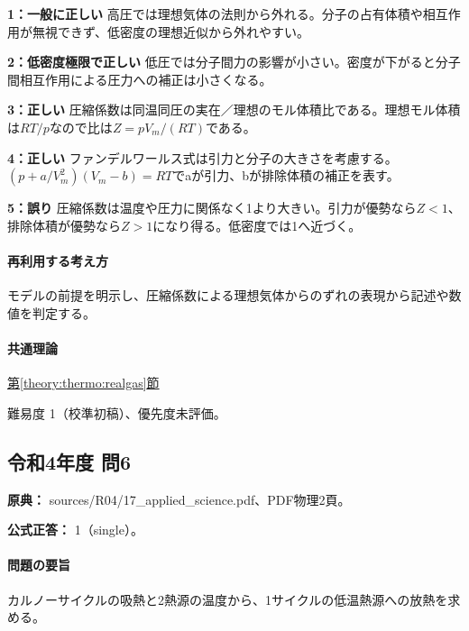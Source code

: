 \noindent\textbf{1：一般に正しい} 高圧では理想気体の法則から外れる。分子の占有体積や相互作用が無視できず、低密度の理想近似から外れやすい。\par

\noindent\textbf{2：低密度極限で正しい} 低圧では分子間力の影響が小さい。密度が下がると分子間相互作用による圧力への補正は小さくなる。\par

\noindent\textbf{3：正しい} 圧縮係数は同温同圧の実在／理想のモル体積比である。理想モル体積は\(RT/p\)なので比は\(Z=pV_m/(RT)\)である。\par

\noindent\textbf{4：正しい} ファンデルワールス式は引力と分子の大きさを考慮する。\((p+a/V_m^2)(V_m-b)=RT\)でaが引力、bが排除体積の補正を表す。\par

\noindent\textbf{5：誤り} 圧縮係数は温度や圧力に関係なく1より大きい。引力が優勢なら\(Z<1\)、排除体積が優勢なら\(Z>1\)になり得る。低密度では1へ近づく。\par

\paragraph{再利用する考え方} モデルの前提を明示し、圧縮係数による理想気体からのずれの表現から記述や数値を判定する。

\paragraph{共通理論} \hyperref[theory:thermo:realgas]{第\ref*{theory:thermo:realgas}節}

\par 難易度 1（校準初稿）、優先度未評価。

\subsection{令和4年度 問6}
\label{q:r04-reg-applied-06}

\noindent\textbf{原典：} sources/R04/17\_applied\_science.pdf、PDF物理2頁。

\textbf{公式正答：} 1（single）。

\paragraph{問題の要旨} カルノーサイクルの吸熱と2熱源の温度から、1サイクルの低温熱源への放熱を求める。

